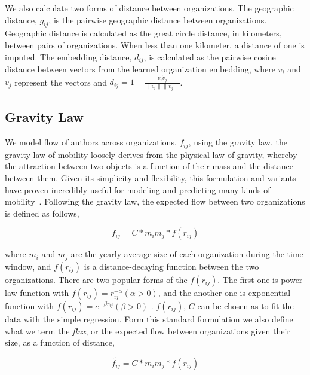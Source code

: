 \documentclass[12pt]{article} %
\begin{document}
We also calculate two forms of distance between organizations. 
The geographic distance, $g_{ij}$, is the pairwise geographic distance between organizations.
Geographic distance is calculated as the great circle distance, in kilometers, between pairs of organizations. 
When less than one kilometer, a distance of one is imputed. 
The embedding distance, $d_{ij}$, is calculated as the pairwise cosine distance between vectors from the learned organization embedding, where $v_{i}$ and $v_{j}$ represent the vectors and $d_{ij} = 1 - \frac{v_{i} \dot v_{j}}{\lVert v_{i} \rVert \lVert v_{j} \rVert}$.

%
%
\subsection{Gravity Law}

We model flow of authors across organizations, $f_{ij}$, using the gravity law. 
the gravity law of mobility loosely derives from the physical law of gravity, whereby the attraction between two objects is a function of their mass and the distance between them.
Given its simplicity and flexibility, this formulation and variants have proven incredibly useful for modeling and predicting many kinds of mobility~\cite{jung2008highwaygravity, curiel2018citygravity, lewer2008immigrationgravity, xia2005measlesgravity, truscott2012epidemicgravity, hong2016busgravity}.
Following the gravity law, the expected flow between two organizations is defined as follows,

\begin{equation}
	\label{eq:gravity_basic}
	f_{ij} = C*m_{i}m_{j}*f(r_{ij})
\end{equation}

where $m_{i}$ and $m_{j}$ are the yearly-average size of each organization during the time window, and $f(r_{ij})$ is a distance-decaying function  between the two organizations. There are two popular forms of the $f(r_{ij})$. The first one is power-law function with $f(r_{ij})= r^{-\alpha}_{ij}  (\alpha > 0)$, and the another one is exponential function with $f(r_{ij}) = e^{-\beta r_{ij}} (\beta > 0)$ \cite{chen2015distance}.  $f(r_{ij})$, $C$ can be chosen as to fit the data with the simple regression.
Form this standard formulation we also define what we term the \textit{flux}, or the expected flow between organizations given their size, as a function of distance,

\begin{equation}
	\label{eq:gravity_flux}
	\widetilde{f_{ij}} = C*m_{i}m_{j}*f(r_{ij})
\end{equation}
\end{document}
